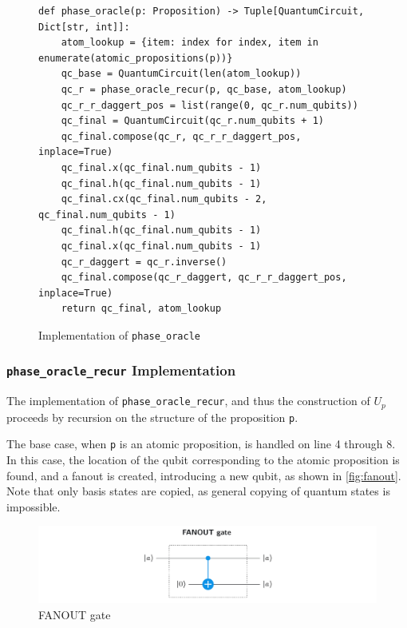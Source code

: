 \begin{figure}[H]
\centering
\begin{verbatim}
def phase_oracle(p: Proposition) -> Tuple[QuantumCircuit, Dict[str, int]]:
    atom_lookup = {item: index for index, item in enumerate(atomic_propositions(p))}
    qc_base = QuantumCircuit(len(atom_lookup))
    qc_r = phase_oracle_recur(p, qc_base, atom_lookup)
    qc_r_r_daggert_pos = list(range(0, qc_r.num_qubits))
    qc_final = QuantumCircuit(qc_r.num_qubits + 1)
    qc_final.compose(qc_r, qc_r_r_daggert_pos, inplace=True)
    qc_final.x(qc_final.num_qubits - 1)
    qc_final.h(qc_final.num_qubits - 1)
    qc_final.cx(qc_final.num_qubits - 2, qc_final.num_qubits - 1)
    qc_final.h(qc_final.num_qubits - 1)
    qc_final.x(qc_final.num_qubits - 1)
    qc_r_daggert = qc_r.inverse()
    qc_final.compose(qc_r_daggert, qc_r_r_daggert_pos, inplace=True)
    return qc_final, atom_lookup
\end{verbatim}
\caption{Implementation of \texttt{phase_oracle} }
\label{fig:phase_oracle}
\end{figure}

\subsubsection{\texttt{phase\_oracle\_recur} Implementation}\label{subsubsec:phase-oracle-recur-implementation}

The implementation of \texttt{phase\_oracle\_recur}, and thus the construction of $U_p$ proceeds by recursion on the structure of the proposition \texttt{p}.

The base case, when \texttt{p} is an atomic proposition, is handled on line 4 through 8.
In this case, the location of the qubit corresponding to the atomic proposition is found, and a fanout is created, introducing a new qubit, as shown in \autoref{fig:fanout}.
Note that only basis states are copied, as general copying of quantum states is impossible.

\begin{figure}[H]
    \centering
    \includegraphics[width=\textwidth]{figures/FANOUT-with-CNOT.jpg}
    \caption{FANOUT gate}
    \label{fig:fanout}
\end{figure}

